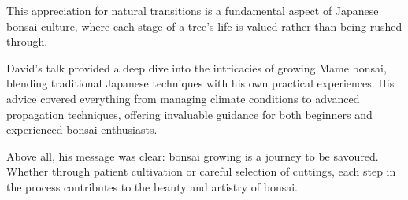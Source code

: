 This appreciation for natural transitions is a fundamental aspect of Japanese bonsai culture, where each stage of a tree's life is valued rather than being rushed through.

\medskip

\noindent
David's talk provided a deep dive into the intricacies of growing Mame bonsai, blending traditional Japanese techniques with his own practical experiences. His advice covered everything from managing climate conditions to advanced propagation techniques, offering invaluable guidance for both beginners and experienced bonsai enthusiasts. 

Above all, his message was clear: bonsai growing is a journey to be savoured. Whether through patient cultivation or careful selection of cuttings, each step in the process contributes to the beauty and artistry of bonsai.



















